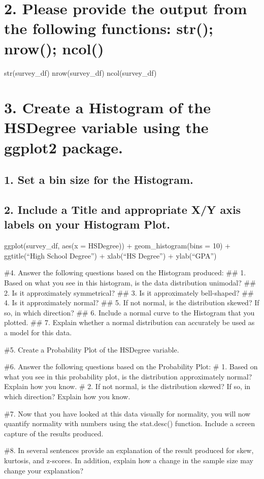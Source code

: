 \documentclass[
]{article}
\begin{document}
\hypertarget{please-provide-the-output-from-the-following-functions-str-nrow-ncol}{%
\section{2. Please provide the output from the following functions:
str(); nrow();
ncol()}\label{please-provide-the-output-from-the-following-functions-str-nrow-ncol}}

str(survey\_df) nrow(survey\_df) ncol(survey\_df)

\hypertarget{create-a-histogram-of-the-hsdegree-variable-using-the-ggplot2-package.}{%
\section{3. Create a Histogram of the HSDegree variable using the
ggplot2
package.}\label{create-a-histogram-of-the-hsdegree-variable-using-the-ggplot2-package.}}

\hypertarget{set-a-bin-size-for-the-histogram.}{%
\subsection{1. Set a bin size for the
Histogram.}\label{set-a-bin-size-for-the-histogram.}}

\hypertarget{include-a-title-and-appropriate-xy-axis-labels-on-your-histogram-plot.}{%
\subsection{2. Include a Title and appropriate X/Y axis labels on your
Histogram
Plot.}\label{include-a-title-and-appropriate-xy-axis-labels-on-your-histogram-plot.}}

ggplot(survey\_df, aes(x = HSDegree)) + geom\_histogram(bins = 10) +
ggtitle(``High School Degree'') + xlab(``HS Degree'') + ylab(``GPA'')

\#4. Answer the following questions based on the Histogram produced:
\#\# 1. Based on what you see in this histogram, is the data
distribution unimodal? \#\# 2. Is it approximately symmetrical? \#\# 3.
Is it approximately bell-shaped? \#\# 4. Is it approximately normal?
\#\# 5. If not normal, is the distribution skewed? If so, in which
direction? \#\# 6. Include a normal curve to the Histogram that you
plotted. \#\# 7. Explain whether a normal distribution can accurately be
used as a model for this data.

\#5. Create a Probability Plot of the HSDegree variable.

\#6. Answer the following questions based on the Probability Plot: \# 1.
Based on what you see in this probability plot, is the distribution
approximately normal? Explain how you know. \# 2. If not normal, is the
distribution skewed? If so, in which direction? Explain how you know.

\#7. Now that you have looked at this data visually for normality, you
will now quantify normality with numbers using the stat.desc() function.
Include a screen capture of the results produced.

\#8. In several sentences provide an explanation of the result produced
for skew, kurtosis, and z-scores. In addition, explain how a change in
the sample size may change your explanation?
\end{document}
